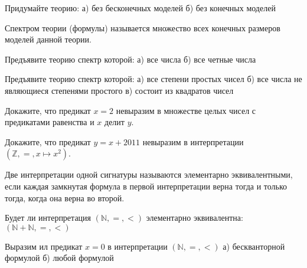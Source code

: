 \setcounter{curtask}{18}


\begin{task}
    Придумайте теорию:
    а) без бесконечных моделей
    б) без конечных моделей
\end{task}

Спектром теории (формулы) называется множество всех конечных размеров моделей данной
теории.

\begin{task}
    Предъявите теорию спектр которой:
    а) все числа
    б) все четные числа
\end{task}

\begin{task}
    Предъявите теорию спектр которой:
    а) все степени простых чисел
    б) все числа не являющиеся степенями простого
    в) состоит из квадратов чисел
\end{task}

\begin{task}
    Докажите, что предикат $x = 2$ невыразим в множестве целых чисел с
    предикатами равенства и $x$ делит $y$.
\end{task}

\begin{task}
    Докажите, что предикат $y = x + 2011$ невыразим в интерпретации
    $(\mathbb{Z}, =, x \mapsto x^2)$.
\end{task}

Две интерпретации одной сигнатуры называются элементарно
эквивалентными, если каждая замкнутая формула в первой интерпретации
верна тогда и только тогда, когда она верна во второй.

\begin{task}
    Будет ли интерпретация $(\mathbb{N}, =, <)$ элементарно
    эквивалентна: $(\mathbb{N} + \mathbb{N}, =, <)$
\end{task}

\begin{task}
    Выразим ил предикат $x = 0$ в интерпретации $(\mathbb{N}, =, <)$
    а) бескванторной формулой
    б) любой формулой
\end{task}